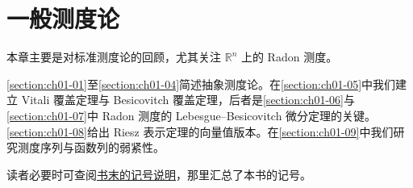 \documentclass[../main.tex]{subfiles}%
\begin{document}
\chapter{一般测度论}\label{chapter:ch01}

本章主要是对标准测度论的回顾，尤其关注 $\mathbb{R}^n$ 上的 Radon 测度。

\cref{section:ch01-01}至\cref{section:ch01-04}简述抽象测度论。在\cref{section:ch01-05}中我们建立 Vitali 覆盖定理与 Besicovitch 覆盖定理，后者是\cref{section:ch01-06}与\cref{section:ch01-07}中 Radon 测度的 Lebesgue--Besicovitch 微分定理的关键。\cref{section:ch01-08}给出 Riesz 表示定理的向量值版本。在\cref{section:ch01-09}中我们研究测度序列与函数列的弱紧性。%

读者必要时可查阅\hyperref[chapter:notation]{书末的记号说明}，那里汇总了本书的记号。











\end{document}
